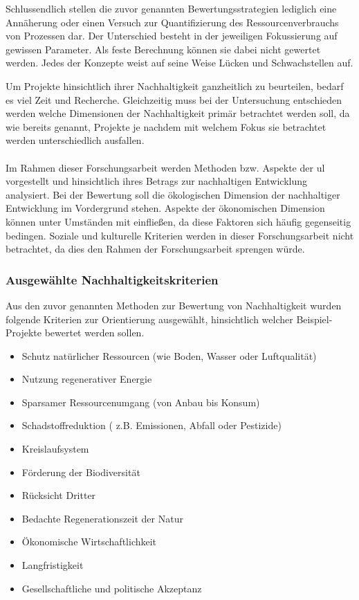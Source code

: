 \documentclass{scrartcl}
\begin{document}
Schlussendlich stellen die zuvor genannten Bewertungsstrategien lediglich eine Annäherung oder einen Versuch zur Quantifizierung des Ressourcenverbrauchs von Prozessen dar. Der Unterschied besteht in der jeweiligen Fokussierung auf gewissen Parameter.  Als feste Berechnung können sie dabei nicht gewertet werden. Jedes der Konzepte weist auf seine Weise Lücken und Schwachstellen auf. 




Um Projekte hinsichtlich ihrer Nachhaltigkeit ganzheitlich zu beurteilen, bedarf es viel Zeit und Recherche. Gleichzeitig muss bei der Untersuchung entschieden werden welche Dimensionen der Nachhaltigkeit primär betrachtet werden soll, da wie bereits genannt, Projekte je nachdem mit welchem Fokus sie betrachtet werden unterschiedlich ausfallen.\\
\\
Im Rahmen dieser Forschungsarbeit werden Methoden bzw. Aspekte der \acs{ul} vorgestellt und hinsichtlich ihres Betrags zur nachhaltigen Entwicklung analysiert. Bei der Bewertung soll die ökologischen Dimension der nachhaltiger Entwicklung im Vordergrund stehen. Aspekte der ökonomischen Dimension können unter Umständen mit einfließen, da diese Faktoren sich häufig gegenseitig bedingen. Soziale und kulturelle Kriterien werden in dieser Forschungsarbeit nicht betrachtet, da dies den Rahmen der Forschungsarbeit sprengen würde.

\subsubsection{Ausgewählte Nachhaltigkeitskriterien} \label{UnsereKriterien}

Aus den zuvor genannten Methoden zur Bewertung von Nachhaltigkeit wurden folgende Kriterien zur Orientierung ausgewählt, hinsichtlich welcher Beispiel-Projekte bewertet werden sollen.

\begin{itemize}
\item Schutz natürlicher Ressourcen (wie Boden, Wasser oder Luftqualität)
\item Nutzung regenerativer Energie
\item Sparsamer Ressourcenumgang (von Anbau bis Konsum)
\item Schadstoffreduktion ( z.B. Emissionen, Abfall oder Pestizide)
\item Kreislaufsystem
\item Förderung der Biodiversität
\item Rücksicht Dritter
\item Bedachte Regenerationszeit der Natur
\item Ökonomische Wirtschaftlichkeit
\item Langfristigkeit
\item Gesellschaftliche und politische Akzeptanz
\end{itemize}
\end{document}
